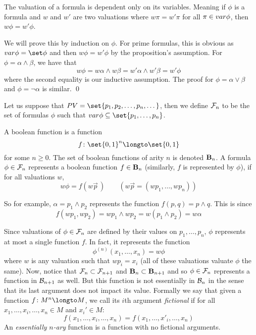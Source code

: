 \bprop

    The valuation of a formula is dependent only on its variables.
    Meaning if $\phi$ is a formula and $w$ and $w'$ are two valuations where $w\pi=w'\pi$ for all $\pi\in{\sl var}\phi$, then $w\phi=w'\phi$.

\eprop

We will prove this by induction on $\phi$.
For prime formulas, this is obvious as $\var\phi=\set\phi$ and then $w\phi=w'\phi$ by the proposition's assumption.
For $\phi=\alpha\land\beta$, we have that
$$ w\phi = w\alpha\land w\beta = w'\alpha\land w'\beta = w'\phi $$
where the second equality is our inductive assumption.
The proof for $\phi=\alpha\lor\beta$ and $\phi=\neg\alpha$ is similar.
\qed

Let us suppose that $\PV=\set{p_1,p_2,\dots,p_n,\dots}$, then we define ${\cal F}_n$ to be the set of formulas $\phi$ such that $\var\phi\subseteq\set{p_1,\dots,p_n}$.

\bdefn

    A {\emphcolor boolean function} is a function
    $$ f\colon\set{0,1}^n\longto\set{0,1} $$
    for some $n\geq0$.
    The set of boolean functions of arity $n$ is denoted ${\bf B}_n$.
    A formula $\phi\in{\cal F}_n$ {\emphcolor represents} a boolean function $f\in{\bf B}_n$ (similarly, $f$ is represented by $\phi$), if for all valuations $w$,
    $$ w\phi = f(w\vec p\,) \qquad (w\vec p=(wp_1,\dots,wp_n)) $$

\edefn

So for example, $\alpha=p_1\land p_2$ represents the function $f(p,q)=p\land q$.
This is since
$$ f(wp_1,wp_2) = wp_1\land wp_2 = w(p_1\land p_2) = w\alpha $$

Since valuations of $\phi\in{\cal F}_n$ are defined by their values on $p_1,\dots,p_n$, $\phi$ represents at most a single function $f$.
In fact, it represents the function
$$ \phi^{(n)}(x_1,\dots,x_n) = w\phi $$
where $w$ is any valuation such that $wp_i=x_i$ (all of these valuations valuate $\phi$ the same).
Now, notice that ${\cal F}_n\subset{\cal F}_{n+1}$ and ${\bf B}_n\subset{\bf B}_{n+1}$ and so $\phi\in{\cal F}_n$ represents a function in ${\cal B}_{n+1}$ as well.
But this function is not essentially in ${\cal B}_n$ in the sense that its last argument does not impact its value.
Formally we say that given a function $f\colon M^n\longto M$, we call its $i$th argument {\it fictional} if for all $x_1,\dots,x_i,\dots,x_n\in M$ and $x_i'\in M$:
$$ f(x_1,\dots,x_i,\dots,x_n) = f(x_1,\dots,x'_i,\dots,x_n) $$
An {\it essentially $n$-ary} function is a function with no fictional arguments.

